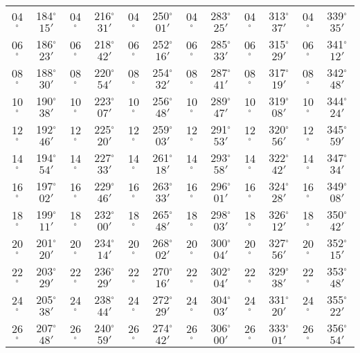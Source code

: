 \begin{table}
{\begin{tabular}{cc|cc|cc|cc|cc|cc}
04$^\circ$ & 184$^\circ$$15'$ & 04$^\circ$ & 216$^\circ$$31'$ & 04$^\circ$ & 250$^\circ$$01'$ & 04$^\circ$ & 283$^\circ$$25'$ &  04$^\circ$ & 313$^\circ$$37'$ & 04$^\circ$ & 339$^\circ$$35'$\\
06$^\circ$ & 186$^\circ$$23'$ & 06$^\circ$ & 218$^\circ$$42'$ & 06$^\circ$ & 252$^\circ$$16'$ & 06$^\circ$ & 285$^\circ$$33'$ &  06$^\circ$ & 315$^\circ$$29'$ & 06$^\circ$ & 341$^\circ$$12'$\\
08$^\circ$ & 188$^\circ$$30'$ & 08$^\circ$ & 220$^\circ$$54'$ & 08$^\circ$ & 254$^\circ$$32'$ & 08$^\circ$ & 287$^\circ$$41'$ &  08$^\circ$ & 317$^\circ$$19'$ & 08$^\circ$ & 342$^\circ$$48'$\\
10$^\circ$ & 190$^\circ$$38'$ & 10$^\circ$ & 223$^\circ$$07'$ & 10$^\circ$ & 256$^\circ$$48'$ & 10$^\circ$ & 289$^\circ$$47'$ &  10$^\circ$ & 319$^\circ$$08'$ & 10$^\circ$ & 344$^\circ$$24'$\\
12$^\circ$ & 192$^\circ$$46'$ & 12$^\circ$ & 225$^\circ$$20'$ & 12$^\circ$ & 259$^\circ$$03'$ & 12$^\circ$ & 291$^\circ$$53'$ &  12$^\circ$ & 320$^\circ$$56'$ & 12$^\circ$ & 345$^\circ$$59'$\\
14$^\circ$ & 194$^\circ$$54'$ & 14$^\circ$ & 227$^\circ$$33'$ & 14$^\circ$ & 261$^\circ$$18'$ & 14$^\circ$ & 293$^\circ$$58'$ &  14$^\circ$ & 322$^\circ$$42'$ & 14$^\circ$ & 347$^\circ$$34'$\\
16$^\circ$ & 197$^\circ$$02'$ & 16$^\circ$ & 229$^\circ$$46'$ & 16$^\circ$ & 263$^\circ$$33'$ & 16$^\circ$ & 296$^\circ$$01'$ &  16$^\circ$ & 324$^\circ$$28'$ & 16$^\circ$ & 349$^\circ$$08'$\\
18$^\circ$ & 199$^\circ$$11'$ & 18$^\circ$ & 232$^\circ$$00'$ & 18$^\circ$ & 265$^\circ$$48'$ & 18$^\circ$ & 298$^\circ$$03'$ &  18$^\circ$ & 326$^\circ$$12'$ & 18$^\circ$ & 350$^\circ$$42'$\\
20$^\circ$ & 201$^\circ$$20'$ & 20$^\circ$ & 234$^\circ$$14'$ & 20$^\circ$ & 268$^\circ$$02'$ & 20$^\circ$ & 300$^\circ$$04'$ &  20$^\circ$ & 327$^\circ$$56'$ & 20$^\circ$ & 352$^\circ$$15'$\\
22$^\circ$ & 203$^\circ$$29'$ & 22$^\circ$ & 236$^\circ$$29'$ & 22$^\circ$ & 270$^\circ$$16'$ & 22$^\circ$ & 302$^\circ$$04'$ &  22$^\circ$ & 329$^\circ$$38'$ & 22$^\circ$ & 353$^\circ$$48'$\\
24$^\circ$ & 205$^\circ$$38'$ & 24$^\circ$ & 238$^\circ$$44'$ & 24$^\circ$ & 272$^\circ$$29'$ & 24$^\circ$ & 304$^\circ$$03'$ &  24$^\circ$ & 331$^\circ$$20'$ & 24$^\circ$ & 355$^\circ$$22'$\\
26$^\circ$ & 207$^\circ$$48'$ & 26$^\circ$ & 240$^\circ$$59'$ & 26$^\circ$ & 274$^\circ$$42'$ & 26$^\circ$ & 306$^\circ$$00'$ &  26$^\circ$ & 333$^\circ$$01'$ & 26$^\circ$ & 356$^\circ$$54'$\\

\end{tabular}}
\end{table}
